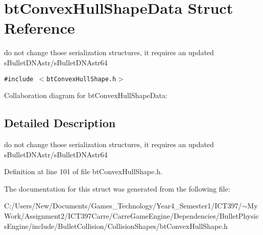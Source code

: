 \hypertarget{structbt_convex_hull_shape_data}{
\section{btConvexHullShapeData Struct Reference}
\label{structbt_convex_hull_shape_data}
}
do not change those serialization structures, it requires an updated sBulletDNAstr/sBulletDNAstr64  


{\tt \#include $<$btConvexHullShape.h$>$}

Collaboration diagram for btConvexHullShapeData:

\subsection{Detailed Description}
do not change those serialization structures, it requires an updated sBulletDNAstr/sBulletDNAstr64 

Definition at line 101 of file btConvexHullShape.h.

The documentation for this struct was generated from the following file:\begin{CompactItemize}
\item 
C:/Users/New/Documents/Games\_\-Technology/Year4\_\-Semester1/ICT397/$\sim$My Work/Assignment2/ICT397Carre/CarreGameEngine/Dependencies/BulletPhysicsEngine/include/BulletCollision/CollisionShapes/btConvexHullShape.h\end{CompactItemize}
